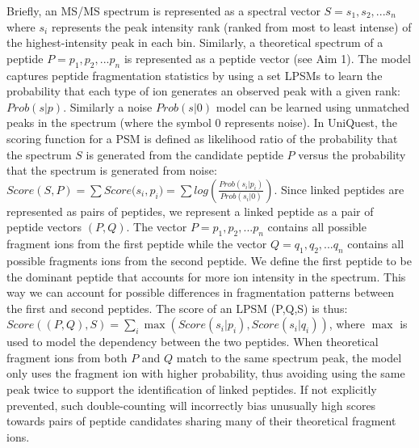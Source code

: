 Briefly, an MS/MS spectrum is represented as a spectral vector 
$S = s_{1}, s_{2}, ... s_{n}$ where $s_{i}$ represents the peak intensity rank (ranked from most to least intense) of the highest-intensity peak in each bin.  Similarly, a theoretical spectrum of a peptide $P = p_{1}, p_{2}, ... p_{n}$ is represented as a peptide vector (see Aim 1).
The model captures peptide fragmentation statistics by using a set LPSMs  to learn the probability that each type of ion generates an observed peak with a given rank: $Prob(s|p)$.  Similarly a noise $Prob(s|0)$ model can be learned using unmatched peaks in the spectrum (where the symbol $0$ represents noise). In UniQuest, the scoring function for a PSM is defined as likelihood ratio of the probability that the spectrum $S$ is generated from the candidate peptide $P$ versus the probability that the  spectrum is generated from noise: $Score(S,P)=\sum{Score(s_{i}}, p_{i})=\sum{log(\frac{Prob(s_{i}|p_{i})}{Prob(s_{i}|0)})}$. Since linked peptides are represented as pairs of peptides, we represent a linked peptide as a pair of peptide  vectors $(P, Q)$. The vector $P = p_{1}, p_{2}, ... p_{n}$ contains all possible fragment ions from the first peptide while the vector $Q = q_{1}, q_{2}, ... q_{n}$ contains all possible fragments ions from the second peptide.  We define the first peptide to be the dominant peptide that accounts for more ion intensity in the spectrum.  This way we can account for possible differences in fragmentation patterns between the first and second peptides.  The score of an LPSM (P,Q,S)  is thus: $Score((P,Q),S) = \sum_i{\max(Score(s_{i}|p_{i}), Score(s_{i}|q_{i}))}$, where $\max$ is used to model the dependency between the two peptides. When theoretical fragment ions from both $P$ and $Q$ match to the same  spectrum peak, the model only uses the fragment ion with higher probability, thus avoiding using the same peak twice to support the identification of linked peptides. If not explicitly prevented, such double-counting will incorrectly bias unusually high scores towards pairs of peptide candidates sharing many of their theoretical fragment ions.

